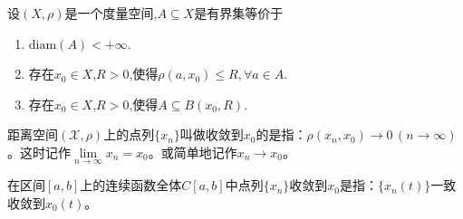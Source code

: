 \documentclass[../../main.tex]{subfiles}%
\begin{document}
\begin{theorem}\label{theorem:有界充要条件-度量空间}
设$(X,\rho)$是一个度量空间,$A\subseteq X$是有界集等价于
\begin{enumerate}[(1)]
\item $\text{diam}(A)<+\infty$.

\item 存在$x_0\in X$,$R>0$,使得$\rho(a,x_0)\leqslant R,\forall a\in A$.

\item 存在$x_0\in X$,$R>0$,使得$A\subseteq B(x_0,R)$.
\end{enumerate}
\end{theorem}

\begin{definition}
距离空间$(\mathscr{X},\rho)$上的点列$\{x_n\}$叫做收敛到$x_0$的是指：$\rho(x_n,x_0)\to 0\,(n\to \infty)$。这时记作$\lim\limits_{n \to \infty} x_n = x_0$。或简单地记作$x_n \to x_0$。
\end{definition}
\begin{remark}
在区间$[a,b]$上的连续函数全体$C[a,b]$中点列$\{x_n\}$收敛到$x_0$是指：$\{x_n(t)\}$一致收敛到$x_0(t)$。
\end{remark}
\end{document}
